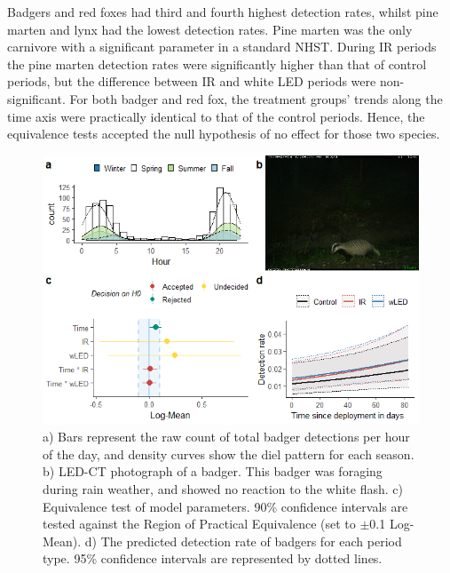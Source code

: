 Badgers and red foxes had third and fourth highest detection rates, whilst pine marten and lynx had the lowest detection rates.
Pine marten was the only carnivore with a significant parameter in a standard NHST. During IR periods the pine marten detection rates were significantly higher than that of control periods, but the difference between IR and white LED periods were non-significant.
For both badger and red fox, the treatment groups' trends along the time axis were practically identical to that of the control periods. Hence, the equivalence tests accepted the null hypothesis of no effect for those two species.



\begin{figure}[b]
	\centering
	\includegraphics[width=12cm]{../R/glmm_sp_files/figure-html/grevling2-1.png}
	\caption[Badger]
	{\scriptsize
		a) Bars represent the raw count of total badger detections per hour of the day, and density curves show the diel pattern for each season.
		b) LED-CT photograph of a badger. This badger was foraging during rain weather, and showed no reaction to the white flash.
		c) Equivalence test of model parameters. 90\% confidence intervals are tested against the Region of Practical Equivalence (set to $\pm$0.1 Log-Mean).
		d) The predicted detection rate of badgers for each period type. 95\% confidence intervals are represented by dotted lines.}
	\label{grevling}
\end{figure}

